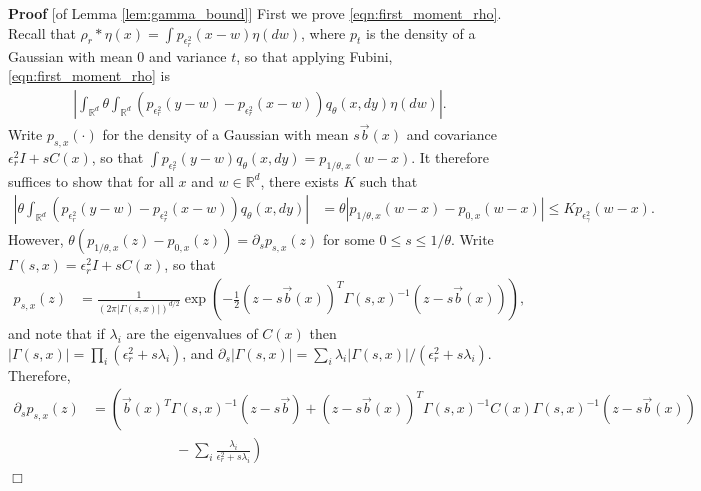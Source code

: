 \documentclass[12pt]{article}
\newenvironment {proof}{{\noindent\bf Proof }}{\hfill $\Box$ \medskip}
\newcommand{\IR}{\mathbb R}
\newcommand{\meanq}{\vec b}    %
\newcommand{\covq}{C}     %
\newcommand{\kernel}{\rho}  %
\newcommand{\smooth}[1]{\kernel_{#1} \! * \!}  %
\begin{document}
\begin{proof}[of Lemma \ref{lem:gamma_bound}]
    First we prove \eqref{eqn:first_moment_rho}.
    Recall that $\smooth{r} \eta(x) = \int p_{\epsilon^2_r}(x - w) \eta(dw)$,
    where $p_t$ is the density of a Gaussian with mean 0 and variance $t$,
    so that applying Fubini, \eqref{eqn:first_moment_rho} is
    \begin{align*}
        \left|
        \int_{\IR^d}
        \theta
            \int_{\IR^d}
                ( p_{\epsilon_r^2}(y - w) - p_{\epsilon_r^2}(x - w) )
            q_\theta(x, dy)
        \eta(dw)
        \right| .
    \end{align*}
    Write $p_{s, x}(\cdot)$ for the density of a Gaussian
    with mean $s \meanq(x)$ and covariance $\epsilon_r^2 I + s \covq(x)$,
    so that $\int p_{\epsilon_r^2}(y - w) q_\theta(x, dy) = p_{1/\theta, x}(w-x)$.
    It therefore suffices to show that for all $x$ and $w \in \IR^d$,
    there exists $K$ such that
    \begin{align} \label{eqn:goal1}
        \left|
        \theta
            \int_{\IR^d}
                ( p_{\epsilon_r^2}(y-w) - p_{\epsilon_r^2}(x-w) )
            q_\theta(x, dy)
        \right|
        &=
        \theta \left|
            p_{1/\theta, x}(w-x) - p_{0, x}(w-x)
        \right|
        \le
        K p_{\epsilon^2_\gamma}(w-x) .
    \end{align}
    However,
    $\theta( p_{1/\theta, x}(z) - p_{0, x}(z) )
    = \partial_s p_{s, x}(z)$ for some $0 \le s \le 1/\theta$.
    Write $\Gamma(s,x) = \epsilon_r^2 I + s \covq(x)$,
    so that
    \begin{align*}
        p_{s, x}(z)
        &=
        \frac{1}{\left(2 \pi |\Gamma(s,x)|\right)^{d/2}}
        \exp\left(
            -\frac{1}{2} (z - s\meanq(x))^T \Gamma(s,x)^{-1} (z - s\meanq(x))
        \right) ,
    \end{align*}
    and note that if $\lambda_i$ are the eigenvalues of $\covq(x)$
    then $|\Gamma(s, x)| = \prod_i (\epsilon_r^2 + s \lambda_i)$,
    and
    $\partial_s |\Gamma(s, x)| = \sum_i \lambda_i |\Gamma(s, x)| / (\epsilon_r^2 + s \lambda_i)$.
    Therefore,
    \begin{align*}
        \partial_s p_{s, x}(z)
        &=
        \left(
            \meanq(x)^T \Gamma(s,x)^{-1} (z - s \meanq)
            +
            (z - s \meanq(x))^T
            \Gamma(s,x)^{-1} \covq(x) \Gamma(s,x)^{-1}
            (z - s \meanq(x))
        \right. \\ & \qquad \qquad \qquad \left. {}
            -
            \sum_i \frac{\lambda_i}{\epsilon_r^2 + s \lambda_i}
        \right)

\end{align*}
\end{proof}
\end{document}
